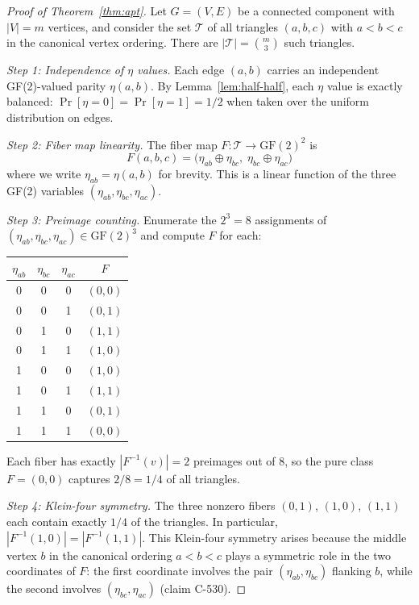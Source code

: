 \documentclass[12pt,openany]{report}
\theoremstyle{definition}
\theoremstyle{plain}
\theoremstyle{remark}
\begin{document}
\begin{proof}[Proof of Theorem~\ref{thm:apt}]
Let $G = (V, E)$ be a connected component with $|V| = m$ vertices, and
consider the set $\mathcal{T}$ of all triangles $(a,b,c)$ with
$a < b < c$ in the canonical vertex ordering.  There are
$|\mathcal{T}| = \binom{m}{3}$ such triangles.

\emph{Step 1: Independence of $\eta$ values.}
Each edge $(a,b)$ carries an independent GF(2)-valued parity $\eta(a,b)$.
By Lemma~\ref{lem:half-half}, each $\eta$ value is exactly balanced:
$\Pr[\eta = 0] = \Pr[\eta = 1] = 1/2$ when taken over the uniform
distribution on edges.

\emph{Step 2: Fiber map linearity.}
The fiber map $F: \mathcal{T} \to \mathrm{GF}(2)^2$ is
\begin{equation}
  F(a,b,c) = \bigl(\eta_{ab} \oplus \eta_{bc},\;
    \eta_{bc} \oplus \eta_{ac}\bigr)
\end{equation}
where we write $\eta_{ab} = \eta(a,b)$ for brevity.  This is a linear
function of the three GF(2) variables $(\eta_{ab}, \eta_{bc}, \eta_{ac})$.

\emph{Step 3: Preimage counting.}
Enumerate the $2^3 = 8$ assignments of $(\eta_{ab}, \eta_{bc}, \eta_{ac})
\in \mathrm{GF}(2)^3$ and compute $F$ for each:
\begin{center}
\begin{tabular}{cccc}
\toprule
$\eta_{ab}$ & $\eta_{bc}$ & $\eta_{ac}$ & $F$ \\
\midrule
0 & 0 & 0 & $(0,0)$ \\
0 & 0 & 1 & $(0,1)$ \\
0 & 1 & 0 & $(1,1)$ \\
0 & 1 & 1 & $(1,0)$ \\
1 & 0 & 0 & $(1,0)$ \\
1 & 0 & 1 & $(1,1)$ \\
1 & 1 & 0 & $(0,1)$ \\
1 & 1 & 1 & $(0,0)$ \\
\bottomrule
\end{tabular}
\end{center}
Each fiber has exactly $|F^{-1}(v)| = 2$ preimages out of 8, so the pure
class $F = (0,0)$ captures $2/8 = 1/4$ of all triangles.

\emph{Step 4: Klein-four symmetry.}
The three nonzero fibers $(0,1)$, $(1,0)$, $(1,1)$ each contain exactly
$1/4$ of the triangles.  In particular, $|F^{-1}(1,0)| = |F^{-1}(1,1)|$.
This Klein-four symmetry arises because the middle vertex $b$ in the
canonical ordering $a < b < c$ plays a symmetric role in the two
coordinates of $F$: the first coordinate involves the pair
$(\eta_{ab}, \eta_{bc})$ flanking $b$, while the second involves
$(\eta_{bc}, \eta_{ac})$ (claim C-530).
\end{proof}
\end{document}
